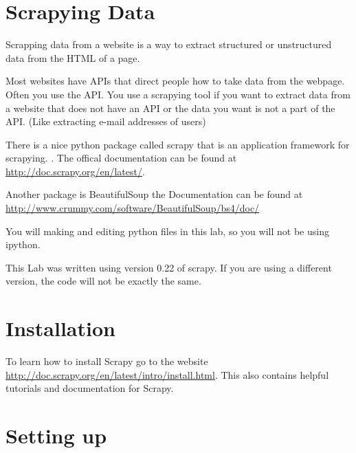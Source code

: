 
\section*{Scrapying Data}
Scrapping data from a website is a way to extract structured or unstructured data from the HTML of a page.

Most websites have APIs that direct people how to take data from the webpage. Often you use the API. You use a scrapying tool if you want to extract data from a website that does not have an API or the data you want is not a part of the API. (Like extracting e-mail addresses of users)

There is a nice python package called scrapy that is an application framework for scrapying. . The offical documentation can be found at \url{http://doc.scrapy.org/en/latest/}. 

Another package is BeautifulSoup the Documentation can be found at \url{http://www.crummy.com/software/BeautifulSoup/bs4/doc/}

\begin{info}
You will making and editing python files in this lab, so you will not be using ipython.
\end{info}

\begin{warn}
This Lab was written using version 0.22 of scrapy. If you are using a different version, the code will not be exactly the same.
\end{warn}

\section*{Installation}

To learn how to install Scrapy go to the website \url{http://doc.scrapy.org/en/latest/intro/install.html}. This also contains helpful tutorials and documentation for Scrapy.

\section*{Setting up}

\begin{comment}
\begin{problem}
Work thourgh the tutorial from the url above. You should turn in items.json as specified in the tutorial.
\end{problem}


When you run
\begin{lstlisting}
scrapy crawl dmoz -o items.json -t json
\end{lstlisting}
which generates a file \li{items.json} where all the scraped items are serialized in JSON. You can also store them in csv or xml by changing all the json to csv or xml.
For example
\begin{lstlisting}
scrapy crawl dmoz -o items.csv -t csv
\end{lstlisting}
generates a file \li{items.csv} where all the scraped items are stored in a csv file.
\end{comment}


